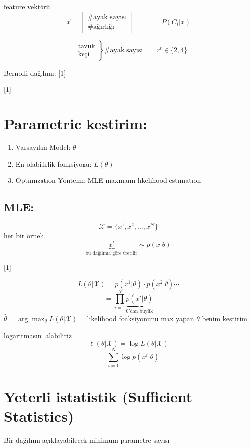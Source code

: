 \documentclass[11pt,a4paper]{article}
\begin{document}

feature vektörü
\[ \vec{x} = \begin{bmatrix} \#\text{ayak sayısı} \\ \#\text{ağırlığı} \end{bmatrix} \qquad\qquad P(C_i|x) \]

\[ \left.\begin{aligned} &\text{tavuk} \\ &\text{keçi} \end{aligned}\right\} \#\text{ayak sayısı} \qquad r^t \in \{2,4\} \]

Bernolli dağılımı:
[1]

[1]

\section{Parametric kestirim:}
\begin{enumerate}[label=\textcircled{\small\arabic*}]
\item Varsayılan Model: \quad $\theta$
\item En olabilirlik fonksiyonu: \quad $L(\theta)$
\item Optimization Yöntemi: \quad MLE \quad maximum likelihood estimation
\end{enumerate}

\subsection{MLE:}
\[ \mathcal{X} = \{x^1, x^2, \ldots, x^N\} \]
her bir örnek.
\[ \underbrace{x^t}_{\text{bu dağılıma göre üretilir}} \sim p(x|\theta) \]

[1]

\[ L(\theta|\mathcal{X}) = p(x^1|\theta)\cdot p(x^2|\theta)\cdots \]
\[ = \prod_{i=1}^{N} \underbrace{p(x^i|\theta)}_{0'\text{dan büyük}} \]
$\hat\theta = \arg\max_\theta L(\theta|\mathcal{X})$ = likelihood fonksiyonunu max yapan $\theta$ benim kestirim

logaritmasını alabiliriz
\[ \ell(\theta|\mathcal{X}) = \log L(\theta|\mathcal{X}) \]
\[ = \sum_{i=1}^{N} \log p(x^i|\theta) \]

\section{Yeterli istatistik (Sufficient Statistics)}
Bir dağılımı açıklayabilecek minimum parametre sayısı
\end{document}
